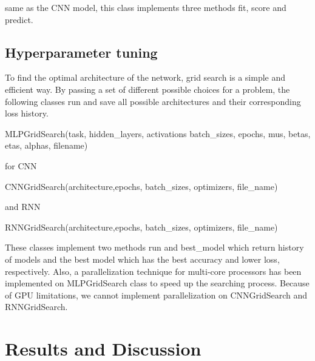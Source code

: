 \documentclass[10pt]{SelfArx} %
\begin{document}
	same as the CNN model, this class implements three methods fit, score and predict.
	
	\subsection{Hyperparameter tuning}
	To find the optimal architecture of the network, grid search is a simple and efficient way. By passing a set of different possible choices for a problem, the following classes run and save all possible architectures and their corresponding loss history.
	\begin{python}
MLPGridSearch(task, hidden_layers, 
activations batch_sizes,
epochs, mus, betas, etas,
alphas, filename)
	\end{python}
	for CNN
	\begin{python}
CNNGridSearch(architecture,epochs,
batch_sizes, optimizers,
file_name)
	\end{python}
	and RNN
	\begin{python}
RNNGridSearch(architecture,epochs,
batch_sizes, optimizers,
file_name)
	\end{python}
	
	These classes implement two methods run and best\_model which return history of models and the best model which has the best accuracy and lower loss, respectively. Also, a parallelization technique for multi-core processors has been implemented on MLPGridSearch class to speed up the searching process. Because of GPU limitations, we cannot implement parallelization on CNNGridSearch and RNNGridSearch.
	
	\section{Results and Discussion}
	
\end{document}
